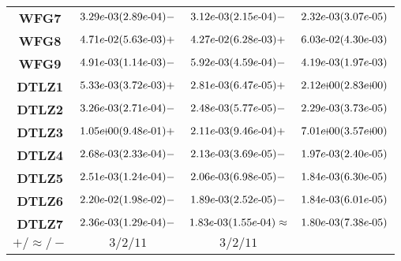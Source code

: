 \documentclass{article}
\begin{document}
\begin{table}[!htp]
\begin{tiny}
\begin{tabular}{c|ccc}
\textbf{WFG7} & ${3.29e\makebox[0.1cm]{-}03(2.89e\makebox[0.1cm]{-}04)-} $ & $ \cellcolor{gray25} {3.12e\makebox[0.1cm]{-}03(2.15e\makebox[0.1cm]{-}04)-} $ & $ \cellcolor{gray95} 2.32e\makebox[0.1cm]{-}03(3.07e\makebox[0.1cm]{-}05)$ \\
\textbf{WFG8} & $\cellcolor{gray25} {4.71e\makebox[0.1cm]{-}02(5.63e\makebox[0.1cm]{-}03)+} $ & $ \cellcolor{gray95} {4.27e\makebox[0.1cm]{-}02(6.28e\makebox[0.1cm]{-}03)+} $ & $ 6.03e\makebox[0.1cm]{-}02(4.30e\makebox[0.1cm]{-}03)$ \\
\textbf{WFG9} & $\cellcolor{gray25} {4.91e\makebox[0.1cm]{-}03(1.14e\makebox[0.1cm]{-}03)-} $ & $ {5.92e\makebox[0.1cm]{-}03(4.59e\makebox[0.1cm]{-}04)-} $ & $ \cellcolor{gray95} 4.19e\makebox[0.1cm]{-}03(1.97e\makebox[0.1cm]{-}03)$ \\
\textbf{DTLZ1} & $\cellcolor{gray25} {5.33e\makebox[0.1cm]{-}03(3.72e\makebox[0.1cm]{-}03)+} $ & $ \cellcolor{gray95} {2.81e\makebox[0.1cm]{-}03(6.47e\makebox[0.1cm]{-}05)+} $ & $ 2.12e\makebox[0.1cm]{+}00(2.83e\makebox[0.1cm]{+}00)$ \\
\textbf{DTLZ2} & ${3.26e\makebox[0.1cm]{-}03(2.71e\makebox[0.1cm]{-}04)-} $ & $ \cellcolor{gray25} {2.48e\makebox[0.1cm]{-}03(5.77e\makebox[0.1cm]{-}05)-} $ & $ \cellcolor{gray95} 2.29e\makebox[0.1cm]{-}03(3.73e\makebox[0.1cm]{-}05)$ \\
\textbf{DTLZ3} & $\cellcolor{gray25} {1.05e\makebox[0.1cm]{+}00(9.48e\makebox[0.1cm]{-}01)+} $ & $ \cellcolor{gray95} {2.11e\makebox[0.1cm]{-}03(9.46e\makebox[0.1cm]{-}04)+} $ & $ 7.01e\makebox[0.1cm]{+}00(3.57e\makebox[0.1cm]{+}00)$ \\
\textbf{DTLZ4} & ${2.68e\makebox[0.1cm]{-}03(2.33e\makebox[0.1cm]{-}04)-} $ & $ \cellcolor{gray25} {2.13e\makebox[0.1cm]{-}03(3.69e\makebox[0.1cm]{-}05)-} $ & $ \cellcolor{gray95} 1.97e\makebox[0.1cm]{-}03(2.40e\makebox[0.1cm]{-}05)$ \\
\textbf{DTLZ5} & ${2.51e\makebox[0.1cm]{-}03(1.24e\makebox[0.1cm]{-}04)-} $ & $ \cellcolor{gray25} {2.06e\makebox[0.1cm]{-}03(6.98e\makebox[0.1cm]{-}05)-} $ & $ \cellcolor{gray95} 1.84e\makebox[0.1cm]{-}03(6.30e\makebox[0.1cm]{-}05)$ \\
\textbf{DTLZ6} & ${2.20e\makebox[0.1cm]{-}02(1.98e\makebox[0.1cm]{-}02)-} $ & $ \cellcolor{gray25} {1.89e\makebox[0.1cm]{-}03(2.52e\makebox[0.1cm]{-}05)-} $ & $ \cellcolor{gray95} 1.84e\makebox[0.1cm]{-}03(6.01e\makebox[0.1cm]{-}05)$ \\
\textbf{DTLZ7} & ${2.36e\makebox[0.1cm]{-}03(1.29e\makebox[0.1cm]{-}04)-} $ & $ \cellcolor{gray25} {1.83e\makebox[0.1cm]{-}03(1.55e\makebox[0.1cm]{-}04)\approx} $ & $ \cellcolor{gray95} 1.80e\makebox[0.1cm]{-}03(7.38e\makebox[0.1cm]{-}05)$ \\
  \hline
\textbf{$+/\approx/-$} & $3/2/11 $ & $ 3/2/11$ \\
  \end{tabular}
  \end{tiny}
\end{table}
\end{document}
